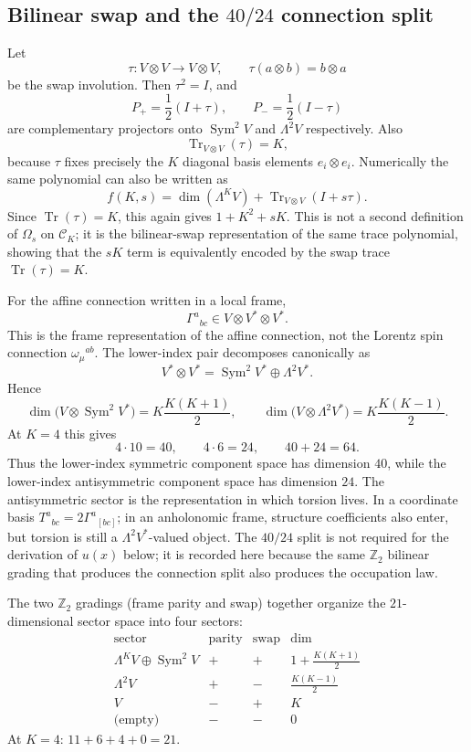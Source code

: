 \documentclass[10pt]{article}
\DeclareMathOperator{\Tr}{Tr}
\DeclareMathOperator{\Sym}{Sym}
\begin{document}
\subsection{\texorpdfstring{Bilinear swap and the $40/24$ connection split}{Bilinear swap and the 40/24 connection split}}
Let
\[
        \tau:V\otimes V\to V\otimes V,
        \qquad
        \tau(a\otimes b)=b\otimes a
\]
be the swap involution. Then $\tau^2=I$, and
\[
        P_+=\frac12(I+\tau),
        \qquad
        P_-=\frac12(I-\tau)
\]
are complementary projectors onto $\Sym^2V$ and $\Lambda^2V$ respectively.
Also
\[
        \Tr_{V\otimes V}(\tau)=K,
\]
because $\tau$ fixes precisely the $K$ diagonal basis elements $e_i\otimes e_i$.
Numerically the same polynomial can also be written as
\[
        f(K,s)=\dim(\Lambda^K V)+\Tr_{V\otimes V}(I+s\tau).
\]
Since $\Tr(\tau)=K$, this again gives $1+K^2+sK$.  This is not a second
definition of $\Omega_s$ on $\mathcal C_K$; it is the bilinear-swap
representation of the same trace polynomial, showing that the $sK$ term
is equivalently encoded by the swap trace $\Tr(\tau)=K$.

For the affine connection written in a local frame,
\[
        \Gamma^a{}_{bc}\in V\otimes V^*\otimes V^*.
\]
This is the frame representation of the affine connection, not the Lorentz spin
connection $\omega_\mu{}^{ab}$. The lower-index pair decomposes canonically as
\[
        V^*\otimes V^*=\Sym^2V^*\oplus\Lambda^2V^*.
\]
Hence
\[
\dim\bigl(V\otimes\Sym^2V^*\bigr)=K\frac{K(K+1)}2,
\qquad
\dim\bigl(V\otimes\Lambda^2V^*\bigr)=K\frac{K(K-1)}2.
\]
At $K=4$ this gives
\[
        4\cdot 10=40,
        \qquad
        4\cdot 6=24,
        \qquad
        40+24=64.
\]
Thus the lower-index symmetric component space has dimension $40$, while the
lower-index antisymmetric component space has dimension $24$. The
antisymmetric sector is the representation in which torsion lives. In a coordinate
basis $T^a{}_{bc}=2\Gamma^a{}_{[bc]}$; in an anholonomic frame, structure
coefficients also enter, but torsion is still a $\Lambda^2V^*$-valued object.
The $40/24$ split is not required for the derivation of $u(x)$ below; it is
recorded here because the same $\mathbb Z_2$ bilinear grading that produces
the connection split also produces the occupation law.

The two $\mathbb Z_2$ gradings (frame parity and swap) together organize the
$21$-dimensional sector space into four sectors:
\[
\begin{array}{c|c|c|c}
\text{sector} & \text{parity} & \text{swap} & \dim \\ \hline
\Lambda^K V\oplus\Sym^2 V & + & + & 1+\tfrac{K(K{+}1)}{2} \\[2pt]
\Lambda^2V & + & - & \tfrac{K(K{-}1)}{2} \\[2pt]
V & - & + & K \\[2pt]
\text{(empty)} & - & - & 0
\end{array}
\]
At $K=4$: $11+6+4+0=21$.
\end{document}
